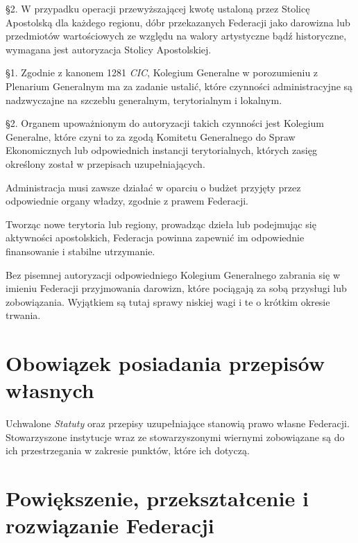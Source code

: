 \S{}2. W przypadku operacji przewyższającej kwotę ustaloną przez Stolicę Apostolską dla każdego regionu, dóbr przekazanych Federacji jako darowizna lub przedmiotów wartościowych ze względu na walory artystyczne bądź historyczne, wymagana jest autoryzacja Stolicy Apostolskiej.




 \S{}1. Zgodnie z kanonem 1281  {\em CIC}, Kolegium Generalne w porozumieniu z Plenarium Generalnym ma za zadanie ustalić, które czynności administracyjne są nadzwyczajne na szczeblu generalnym, terytorialnym i lokalnym.


\S{}2. Organem upoważnionym do autoryzacji takich czynności jest Kolegium Generalne, które czyni to za zgodą Komitetu Generalnego do Spraw Ekonomicznych lub odpowiednich instancji terytorialnych, których zasięg określony został w przepisach uzupełniających.
 


 Administracja musi zawsze działać w oparciu o budżet przyjęty przez odpowiednie organy władzy, zgodnie z prawem Federacji.
 


 Tworząc nowe terytoria lub regiony, prowadząc dzieła lub podejmując się aktywności apostolskich, Federacja powinna zapewnić im odpowiednie finansowanie i stabilne utrzymanie.
 


 Bez pisemnej autoryzacji odpowiedniego Kolegium Generalnego zabrania się w imieniu Federacji przyjmowania darowizn, które pociągają za sobą przysługi lub zobowiązania. Wyjątkiem są tutaj sprawy niskiej wagi i te o krótkim okresie trwania.






\chapter{Obowiązek posiadania przepisów własnych}


 Uchwalone {\em Statuty} oraz przepisy uzupełniające stanowią prawo własne Federacji. Stowarzyszone instytucje wraz ze stowarzyszonymi wiernymi zobowiązane są do ich przestrzegania w zakresie punktów, które ich dotyczą.


\chapter{Powiększenie, przekształcenie i rozwiązanie Federacji}



